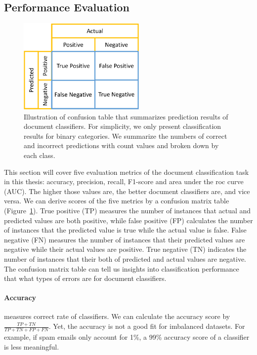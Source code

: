 \subsection{Performance Evaluation}
\label{chap2:subsec:eval}

\begin{figure}[t!]
\centering
\includegraphics[width=0.55\textwidth]{images/chapter2/confusion-table.pdf}
\caption{Illustration of confusion table that summarizes prediction results of document classifiers. For simplicity, we only present classification results for binary categories. We summarize the numbers of correct and incorrect predictions with count values and broken down by each class.}
\label{chap2:fig:confusion}
\end{figure}


This section will cover five evaluation metrics of the document classification task in this thesis: accuracy, precision, recall, F1-score and area under the roc curve (AUC).
The higher those values are, the better document classifiers are, and vice versa.
We can derive scores of the five metrics by a confusion matrix table (Figure~\ref{chap2:fig:confusion}). 
True positive (TP) measures the number of instances that actual and predicted values are both positive, while false positive (FP) calculates the number of instances that the predicted value is true while the actual value is false.
False negative (FN) measures the number of instances that their predicted values are negative while their actual values are positive.
True negative (TN) indicates the number of instances that their both of predicted and actual values are negative.
The confusion matrix table can tell us insights into classification performance that what types of errors are for document classifiers.


\paragraph{Accuracy} measures correct rate of classifiers. We can calculate the accuracy score by $\frac{TP+TN}{TP+TN+FP+FN}$. Yet, the accuracy is not a good fit for imbalanced datasets. For example, if spam emails only account for 1\%, a 99\% accuracy score of a classifier is less meaningful.

